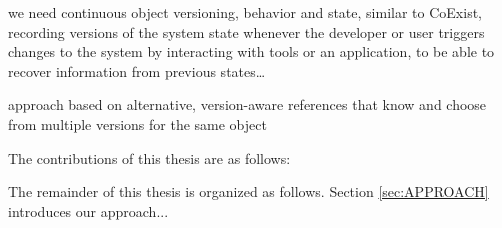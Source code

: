 we need continuous object versioning, behavior and state, similar to CoExist, recording versions of the system state whenever the developer or user triggers changes to the system by interacting with tools or an application, to be able to recover information from previous states…

approach based on alternative, version-aware references that know and choose from multiple versions for the same object




The contributions of this thesis are as follows:

The remainder of this thesis is organized as follows. Section \ref{sec:APPROACH} introduces our approach...
